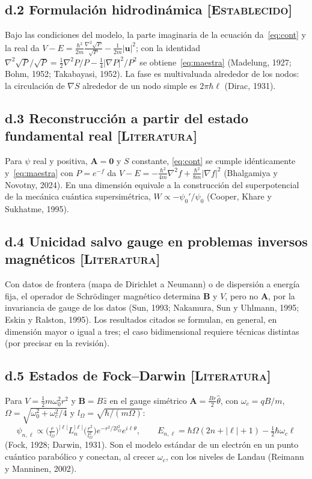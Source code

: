 \documentclass[12pt,letterpaper]{article}
\newcommand{\uv}{\mathbf{u}}
\newcommand{\Av}{\mathbf{A}}
\newcommand{\Bv}{\mathbf{B}}
\newcommand{\grad}{\nabla}
\newcommand{\EST}{\textsc{[Establecido]}}
\newcommand{\LIT}{\textsc{[Literatura]}}
\begin{document}
\subsection*{d.2 Formulación hidrodinámica \EST}
Bajo las condiciones del modelo, la parte imaginaria de la ecuación da~\eqref{eq:cont} y la real da
$V-E=\frac{\hbar^2}{2m}\frac{\grad^2\sqrt P}{\sqrt P}-\frac{1}{2m}|\uv|^2$; con la identidad
$\grad^2\sqrt P/\sqrt P=\frac12\grad^2P/P-\frac14|\grad P|^2/P^2$ se obtiene~\eqref{eq:maestra} (Madelung, 1927; Bohm,
1952; Takabayasi, 1952). La fase es multivaluada alrededor de los nodos: la circulación de $\grad S$ alrededor de un nodo
simple es $2\pi\hbar\ell$ (Dirac, 1931).

\subsection*{d.3 Reconstrucción a partir del estado fundamental real \LIT}
Para $\psi$ real y positiva, $\Av=\mathbf 0$ y $S$ constante, \eqref{eq:cont} se cumple idénticamente y~\eqref{eq:maestra}
con $P=e^{-f}$ da $V-E=-\frac{\hbar^2}{4m}\grad^2f+\frac{\hbar^2}{8m}|\grad f|^2$ (Bhalgamiya y Novotny, 2024). En una
dimensión equivale a la construcción del superpotencial de la mecánica cuántica supersimétrica,
$W\propto-\psi_0'/\psi_0$ (Cooper, Khare y Sukhatme, 1995).

\subsection*{d.4 Unicidad salvo gauge en problemas inversos magnéticos \LIT}
Con datos de frontera (mapa de Dirichlet a Neumann) o de dispersión a energía fija, el operador de Schrödinger magnético
determina $\Bv$ y $V$, pero no $\Av$, por la invariancia de gauge de los datos (Sun, 1993; Nakamura, Sun y Uhlmann, 1995;
Eskin y Ralston, 1995). Los resultados citados se formulan, en general, en dimensión mayor o igual a tres; el caso
bidimensional requiere técnicas distintas (por precisar en la revisión).

\subsection*{d.5 Estados de Fock--Darwin \LIT}
Para $V=\frac12m\omega_0^2r^2$ y $\Bv=B\hat z$ en el gauge simétrico $\Av=\frac{Br}{2}\hat\theta$, con $\omega_c=qB/m$,
$\Omega=\sqrt{\omega_0^2+\omega_c^2/4}$ y $l_\Omega=\sqrt{\hbar/(m\Omega)}$:
\begin{equation}
  \psi_{n,\ell}\propto\Big(\tfrac{r}{l_\Omega}\Big)^{|\ell|}L_n^{|\ell|}\!\Big(\tfrac{r^2}{l_\Omega^2}\Big)e^{-r^2/2l_\Omega^2}e^{i\ell\theta},
  \qquad E_{n,\ell}=\hbar\Omega(2n+|\ell|+1)-\tfrac12\hbar\omega_c\ell
\end{equation}
(Fock, 1928; Darwin, 1931). Son el modelo estándar de un electrón en un punto cuántico parabólico y conectan, al crecer
$\omega_c$, con los niveles de Landau (Reimann y Manninen, 2002).
\end{document}
